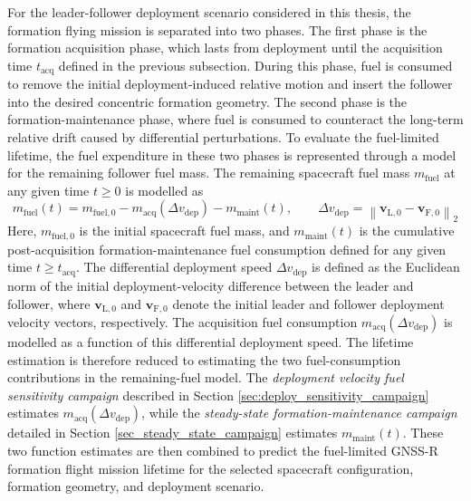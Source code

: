 For the leader-follower deployment scenario considered in this thesis, the formation flying mission is separated into two phases. The first phase is the formation acquisition phase, which lasts from deployment until the acquisition time $t_{\mathrm{acq}}$ defined in the previous subsection. During this phase, fuel is consumed to remove the initial deployment-induced relative motion and insert the follower into the desired concentric formation geometry. The second phase is the formation-maintenance phase, where fuel is consumed to counteract the long-term relative drift caused by differential perturbations. To evaluate the fuel-limited lifetime, the fuel expenditure in these two phases is represented through a model for the remaining follower fuel mass. The remaining spacecraft fuel mass $m_{\mathrm{fuel}}$ at any given time $t \geq 0$ is modelled as
\begin{equation}
    m_{\mathrm{fuel}}(t)
    =
    m_{\mathrm{fuel},0}
    -
    m_{\mathrm{acq}}(\Delta v_{\mathrm{dep}})
    -
    m_{\mathrm{maint}}(t),
    \qquad
    \Delta v_{\mathrm{dep}}
    =
    \left\|
    \mathbf{v}_{\mathrm{L},0}
    -
    \mathbf{v}_{\mathrm{F},0}
    \right\|_2
\end{equation}
Here, $m_{\mathrm{fuel},0}$ is the initial spacecraft fuel mass, and $m_{\mathrm{maint}}(t)$ is the cumulative post-acquisition formation-maintenance fuel consumption defined for any given time $t \geq t_{\mathrm{acq}}$. The differential deployment speed $\Delta v_{\mathrm{dep}}$ is defined as the Euclidean norm of the initial deployment-velocity difference between the leader and follower, where $\mathbf{v}_{\mathrm{L},0}$ and $\mathbf{v}_{\mathrm{F},0}$ denote the initial leader and follower deployment velocity vectors, respectively. The acquisition fuel consumption $m_{\mathrm{acq}}(\Delta v_{\mathrm{dep}})$ is modelled as a function of this differential deployment speed. The lifetime estimation is therefore reduced to estimating the two fuel-consumption contributions in the remaining-fuel model. The \textit{deployment velocity fuel sensitivity campaign} described in Section \ref{sec:deploy_sensitivity_campaign} estimates $m_{\mathrm{acq}}(\Delta v_{\mathrm{dep}})$, while the \textit{steady-state formation-maintenance campaign} detailed in Section \ref{sec_steady_state_campaign} estimates $m_{\mathrm{maint}}(t)$. These two function estimates are then combined to predict the fuel-limited GNSS-R formation flight mission lifetime for the selected spacecraft configuration, formation geometry, and deployment scenario.

